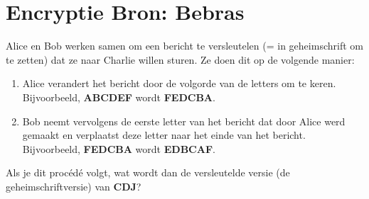 \documentclass[12pt, a4paper]{article}
\begin{document}
	\begin{minipage}{\textwidth}
		\section{Encryptie \hfill\small Bron: Bebras}
			Alice en Bob werken samen om een bericht te versleutelen (= in geheimschrift om te zetten) dat ze naar Charlie willen sturen. Ze doen dit op de volgende manier:
			\begin{enumerate}
				\item Alice verandert het bericht door de volgorde van de letters om te keren. 
				Bijvoorbeeld, \textbf{ABCDEF} wordt \textbf{FEDCBA}.
				\item Bob neemt vervolgens de eerste letter van het bericht dat door Alice werd gemaakt en verplaatst deze letter naar het einde van het bericht. Bijvoorbeeld, \textbf{FEDCBA} wordt \textbf{EDBCAF}.
			\end{enumerate}
			Als je dit proc\'ed\'e volgt, wat wordt dan de versleutelde versie (de geheimschriftversie) van \textbf{CDJ}? \\
			

	\end{minipage}
		
\end{document}
